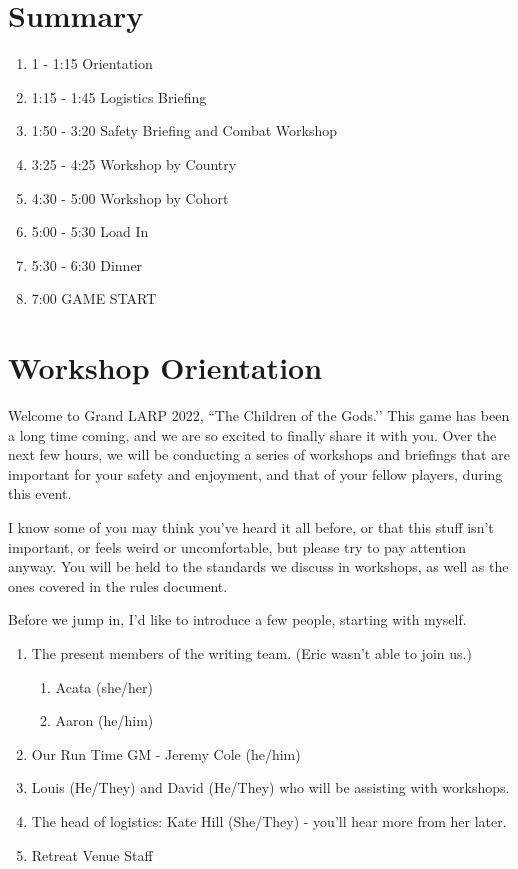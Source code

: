 \documentclass[green]{GL2020}
\begin{document}
\name{\gPreGameSafety{}}

\section*{Summary}
\begin{enumerate}
	\item 1 - 1:15 Orientation
	\item 1:15 - 1:45 Logistics Briefing
	\item 1:50 - 3:20 Safety Briefing and Combat Workshop
	\item 3:25 - 4:25 Workshop by Country
	\item 4:30 - 5:00 Workshop by Cohort
	\item 5:00 - 5:30 Load In
	\item 5:30 - 6:30 Dinner
	\item 7:00 GAME START
\end{enumerate}

\section*{Workshop Orientation}
Welcome to Grand LARP 2022, ``The Children of the Gods.’’ This game has been a long time coming, and we are so excited to finally share it with you. Over the next few hours, we will be conducting a series of workshops and briefings that are important for your safety and enjoyment, and that of your fellow players, during this event. 

I know some of you may think you’ve heard it all before, or that this stuff isn’t important, or feels weird or uncomfortable, but please try to pay attention anyway. You will be held to the standards we discuss in workshops, as well as the ones covered in the rules document.

Before we jump in, I’d like to introduce a few people, starting with myself.
\begin{enumerate}
	\item The present members of the writing team. (Eric wasn't able to join us.)
	
	\begin{enumerate}
		\item Acata (she/her)
		\item Aaron (he/him)
	\end{enumerate}
	\item Our Run Time GM - Jeremy Cole (he/him)
	\item Louis (He/They) and David (He/They) who will be assisting with workshops.
	\item The head of logistics: Kate Hill (She/They) - you’ll hear more from her later.
	\item Retreat Venue Staff
\end{enumerate}
\end{document}
